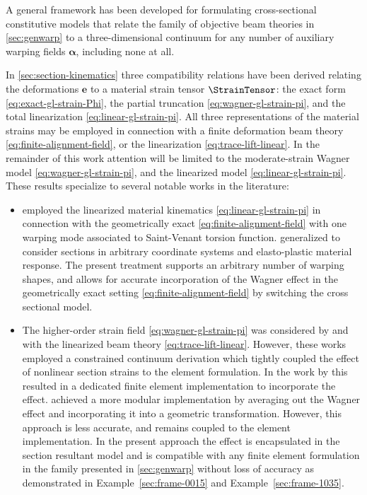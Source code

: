 A general framework has been developed for formulating cross-sectional constitutive models that relate the family of objective beam theories in \cref{sec:genwarp} to a three-dimensional continuum for any number of auxiliary warping fields \(\bm{\alpha}\), including none at all. 

In \cref{sec:section-kinematics} three compatibility relations have been derived relating the deformations \(\bm{e}\) to a material strain tensor \(\StrainTensor\): the exact form \eqref{eq:exact-gl-strain-Phi}, the partial truncation \eqref{eq:wagner-gl-strain-pi}, and the total linearization \eqref{eq:linear-gl-strain-pi}. 
All three representations of the material strains may be employed in connection with a finite deformation beam theory \eqref{eq:finite-alignment-field}, or the linearization \eqref{eq:trace-lift-linear}. 
In the remainder of this work attention will be limited to the moderate-strain Wagner model \eqref{eq:wagner-gl-strain-pi}, and the linearized model \eqref{eq:linear-gl-strain-pi}.
These results specialize to several notable works in the literature:
\begin{itemize}
    \item \cite{simo1991geometricallyexact} employed the linearized material kinematics \eqref{eq:linear-gl-strain-pi} in connection with the geometrically exact \eqref{eq:finite-alignment-field} with one warping mode associated to Saint-Venant torsion function. \cite{gruttmann2000theory} generalized \cite{simo1991geometricallyexact} to consider sections in arbitrary coordinate systems and elasto-plastic material response. 
    The present treatment supports an arbitrary number of warping shapes, and allows for accurate incorporation of the Wagner effect in the geometrically exact setting \eqref{eq:finite-alignment-field} by switching the cross sectional model. 
    \item The higher-order strain field \eqref{eq:wagner-gl-strain-pi} was considered by \cite{battini2002corotational-thesis} and \cite{lecorvec2012nonlinear} with the linearized beam theory \eqref{eq:trace-lift-linear}. 
    However, these works employed a constrained continuum derivation which tightly coupled the effect of nonlinear section strains to the element formulation. In the work by \cite{battini2002corotational-thesis} this resulted in a dedicated finite element implementation to incorporate the effect. \cite{lecorvec2012nonlinear} achieved a more modular implementation by averaging out the Wagner effect and incorporating it into a geometric transformation. However, this approach is less accurate, and remains coupled to the element implementation.
    In the present approach the effect is encapsulated in the section resultant model and is compatible with any finite element formulation in the family presented in \cref{sec:genwarp} without loss of accuracy as demonstrated in Example~\ref{sec:frame-0015} and Example~\ref{sec:frame-1035}.
\end{itemize}

